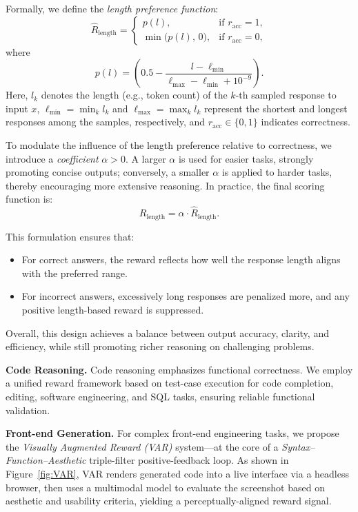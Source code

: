 Formally, we define the \emph{length preference function}:
$$\hat{R}_{\text{length}} =\begin{cases}p(l), & \text{if } r_{\text{acc}} = 1, \\[4pt]\min\!\big(p(l),\, 0\big), & \text{if } r_{\text{acc}} = 0,\end{cases}$$
where
$$p(l) = \left(0.5 - \frac{l - \ell_{\min}}{\ell_{\max} - \ell_{\min} + 10^{-9}}\right).$$
Here, $l_k$ denotes the length (e.g., token count) of the $k$-th sampled response to input $x$, 
$\ell_{\min} = \min_k l_k$ and $\ell_{\max} = \max_k l_k$ represent the shortest and longest responses among the samples, respectively, and $r_{\text{acc}} \in \{0,1\}$ indicates correctness.  

To modulate the influence of the length preference relative to correctness, we introduce a \emph{coefficient} $\alpha > 0$.  
A larger $\alpha$ is used for easier tasks, strongly promoting concise outputs; conversely, a smaller $\alpha$ is applied to harder tasks, thereby encouraging more extensive reasoning.  
In practice, the final scoring function is:
$$R_{\text{length}} = \alpha \cdot \hat{R}_{\text{length}}.$$

This formulation ensures that:
\begin{itemize}
    \item For correct answers, the reward reflects how well the response length aligns with the preferred range.
    \item For incorrect answers, excessively long responses are penalized more, and any positive length-based reward is suppressed.
\end{itemize}
Overall, this design achieves a balance between output accuracy, clarity, and efficiency, while still promoting richer reasoning on challenging problems.

\textbf{Code Reasoning.}
Code reasoning emphasizes functional correctness. We employ a unified reward framework based on test-case execution for code completion, editing, software engineering, and SQL tasks, ensuring reliable functional validation.

\textbf{Front-end Generation.}
For complex front-end engineering tasks, we propose the \emph{Visually Augmented Reward (VAR)} system—at the core of a \emph{Syntax–Function–Aesthetic} triple-filter positive-feedback loop. As shown in Figure~\ref{fig:VAR}, VAR renders generated code into a live interface via a headless browser, then uses a multimodal model to evaluate the screenshot based on aesthetic and usability criteria, yielding a perceptually-aligned reward signal.

